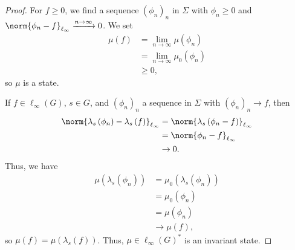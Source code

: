 \documentclass[10pt]{mypackage2}
\begin{document}
\begin{proof}
  For $f\geq 0$, we find a sequence $\left(\phi_n\right)_n$ in $\Sigma$ with $\phi_n\geq 0$ and $\norm{\phi_n - f}_{\ell_{\infty}} \xrightarrow{n\rightarrow\infty}0$. We set
  \begin{align*}
    \mu\left(f\right) &= \lim_{n\rightarrow\infty}\mu\left(\phi_n\right)\\
                      &= \lim_{n\rightarrow\infty}\mu_0\left(\phi_n\right)\\
                      &\geq 0,
  \end{align*}
  so $\mu$ is a state.\newline

  If $f\in \ell_{\infty}\left(G\right)$, $s\in G$, and $\left(\phi_n\right)_n$ a sequence in $\Sigma$ with $\left(\phi_n\right)_n\rightarrow f$, then
  \begin{align*}
    \norm{\lambda_s\left(\phi_n\right) - \lambda_s\left(f\right)}_{\ell_{\infty}} &= \norm{\lambda_s\left(\phi_n - f\right)}_{\ell_{\infty}}\\
                                                                                  &= \norm{\phi_n - f}_{\ell_{\infty}}\\
                                                                  &\rightarrow 0.
  \end{align*}
  Thus, we have
  \begin{align*}
    \mu\left(\lambda_s\left(\phi_n\right)\right) &= \mu_0\left(\lambda_s\left(\phi_n\right)\right)\\
                                                 &= \mu_0\left(\phi_n\right)\\
                                                 &= \mu\left(\phi_n\right)\\
                                                 &\rightarrow \mu\left(f\right),
  \end{align*}
  so $\mu\left(f\right) = \mu\left(\lambda_s\left(f\right)\right)$. Thus, $\mu\in \ell_{\infty}\left(G\right)^{\ast}$ is an invariant state.
\end{proof}
\end{document}
